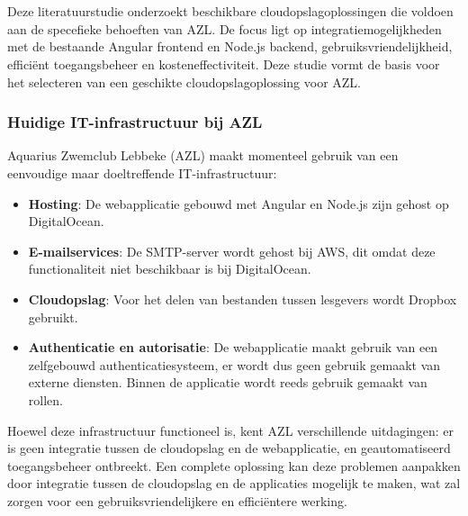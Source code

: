 \chapter{}%
\label{ch:stand-van-zaken}



Deze literatuurstudie onderzoekt beschikbare cloudopslagoplossingen die voldoen aan de specefieke behoeften van AZL. 
De focus ligt op integratiemogelijkheden met de bestaande Angular frontend en Node.js backend, gebruiksvriendelijkheid, efficiënt toegangsbeheer en kosteneffectiviteit. 
Deze studie vormt de basis voor het selecteren van een geschikte cloudopslagoplossing voor AZL.

\subsection{Huidige IT-infrastructuur bij AZL}
Aquarius Zwemclub Lebbeke (AZL) maakt momenteel gebruik van een eenvoudige maar doeltreffende IT-infrastructuur:
\begin{itemize}
    \item \textbf{Hosting}: De webapplicatie gebouwd met Angular en Node.js zijn gehost op DigitalOcean.
    \item \textbf{E-mailservices}: De SMTP-server wordt gehost bij AWS, dit omdat deze functionaliteit niet beschikbaar is bij DigitalOcean.
    \item \textbf{Cloudopslag}: Voor het delen van bestanden tussen lesgevers wordt Dropbox gebruikt.
    \item \textbf{Authenticatie en autorisatie}: De webapplicatie maakt gebruik van een zelfgebouwd authenticatiesysteem, er wordt dus geen gebruik gemaakt van externe diensten. Binnen de applicatie wordt reeds gebruik gemaakt van rollen.
\end{itemize}
Hoewel deze infrastructuur functioneel is, kent AZL verschillende uitdagingen: er is geen integratie tussen de cloudopslag en de 
webapplicatie, en geautomatiseerd toegangsbeheer ontbreekt. Een complete oplossing kan deze problemen aanpakken 
door integratie tussen de cloudopslag en de applicaties mogelijk te maken, wat zal zorgen voor een gebruiksvriendelijkere en efficiëntere werking.

